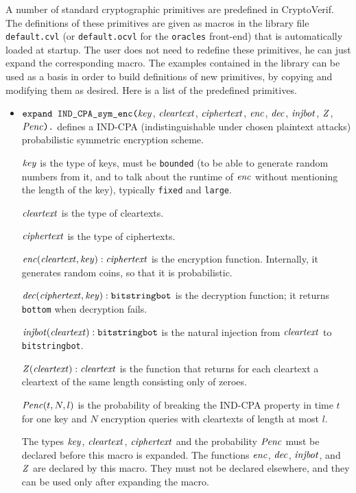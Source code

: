 \documentclass{article}
\begin{document}
A number of standard cryptographic primitives are predefined in
CryptoVerif.  The definitions of these primitives are given as macros
in the library file \texttt{default.cvl} (or \texttt{default.ocvl} for
the \texttt{oracles} front-end) that is automatically loaded at
startup.  The user does not need to redefine these primitives, he can
just expand the corresponding macro. The examples contained in the library
can be used as a basis in order to build definitions of new primitives, by copying
and modifying them as desired. Here is a list of the predefined primitives.
\begin{itemize}

\item $\texttt{expand IND\_CPA\_sym\_enc(}\mathit{key}$,
  $\mathit{cleartext}$, $\mathit{ciphertext}$, $\mathit{enc}$,
  $\mathit{dec}$, $\mathit{injbot}$, $\mathit{Z}$, $\mathit{Penc}\texttt{).}$ defines a
  IND-CPA (indistinguishable under chosen plaintext attacks)
  probabilistic symmetric encryption scheme.

   $\mathit{key}$ is the type of keys, must be \texttt{bounded} (to be able to generate random numbers from it, and to talk about the runtime of $\mathit{enc}$ without mentioning the length of the key), typically \texttt{fixed} and \texttt{large}.

   $\mathit{cleartext}$ is the type of cleartexts.

   $\mathit{ciphertext}$ is the type of ciphertexts.

   $\mathit{enc}(\mathit{cleartext}, \mathit{key}): \mathit{ciphertext}$ is the encryption function. Internally, it generates random coins, so that it is probabilistic.

   $\mathit{dec}(\mathit{ciphertext}, \mathit{key}): \texttt{bitstringbot}$ is the
  decryption function; it returns \texttt{bottom} when decryption
  fails.

   $\mathit{injbot}(\mathit{cleartext}): \texttt{bitstringbot}$ is the natural
  injection from $\mathit{cleartext}$ to \texttt{bitstringbot}.

   $\mathit{Z}(\mathit{cleartext}): \mathit{cleartext}$ is the function that
  returns for each cleartext a cleartext of the same length consisting
  only of zeroes.

  $\mathit{Penc}(t, N, l)$ is the probability of breaking the IND-CPA
  property in time $t$ for one key and $N$ encryption queries with
  cleartexts of length at most $l$.

   The types $\mathit{key}$, $\mathit{cleartext}$,
   $\mathit{ciphertext}$ and the probability $\mathit{Penc}$ must
   be declared before this macro is expanded. The functions
   $\mathit{enc}$, $\mathit{dec}$, $\mathit{injbot}$, and $\mathit{Z}$ are declared by this
   macro. They must not be declared elsewhere, and they can be used
   only after expanding the macro.


\end{itemize}
\end{document}

